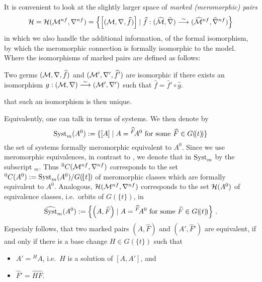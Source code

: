 It is convenient to look at the slightly larger space of \emph{marked
(meromorphic) pairs}
\[
  \mathcal{H}=\mathcal{H}(\mathcal{M}^{nf},\nabla^{nf})=\left\{
    \left[(\mathcal{M},\nabla,\widehat f)\right]
      \mid
      \widehat f:(\widehat{\mathcal{M}},\widehat\nabla)
        \overset{\sim}\longrightarrow
        (\widehat{\mathcal{M}}^{nf},\widehat\nabla^{nf})
  \right\}
\]
in which we also handle the additional information, of the formal isomorphism,
by which the meromorphic connection is formally isomorphic to the model.
Where the isomorphisms of marked pairs are defined as follows:
\begin{defn}
  Two germs $(\mathcal{M},\nabla,\widehat f)$ and $(\mathcal{M}',\nabla',\widehat f')$ are
  isomorphic if there exists an isomorphism
  $g:(\mathcal{M},\nabla)\overset{\sim}\longrightarrow(\mathcal{M}',\nabla')$ such that
  $\hat f=\hat f'\circ \hat g$.
  \begin{s-rem}
     \cite[111]{sabbah2007isomonodromic} that such
    an isomorphism is then unique.
  \end{s-rem}
\end{defn}

Equivalently, one can talk in terms of systems. We then denote by
\[
  \operatorname{Syst}_m(A^0):=\{[A]
    \mid A={}^{\widehat F}\!A^0 \text{ for some } \widehat F\in G(\!(t)\!)\}
\]
the set of systems formally meromorphic equivalent to $A^0$.
Since we use meromorphic equivalences, in contrast to \cite{boalch,thboalch},
we denote that in $\operatorname{Syst}_m$ by the subscript ${}_m$.
Thus ${}^0C(\mathcal{M}^{nf},\nabla^{nf})$ corresponds to
the set ${}^0C(A^0):=\operatorname{Syst}_m(A^0)/G(\!\{t\}\!)$ of meromorphic classes which
are formally equivalent to $A^0$.
Analogous, $\mathcal{H}(\mathcal{M}^{nf},\nabla^{nf})$ corresponds to the set $\mathcal{H}(A^0)$ of
equivalence classes, i.e.\ orbits of $G(\!\{t\}\!)$, in
\[
  \widehat{\operatorname{Syst}}_m(A^0):=\left\{\left(A,\widehat F\right)
    \mid A={}^{\widehat F}\!A^0 \text{ for some } \widehat F\in G(\!(t)\!)\right\} \,.
\]
Especialy follows, that two marked pairs $(A,\hat F)$ and $(A',\hat F')$ are
equivalent, if and only if there is a base change
$H\in G(\!\{t\}\!)$ such that
\begin{itemize}
  \item $A'={}^{H}\!A$, i.e.\ $H$ is a solution of $[A,A']$, and
  \item $\hat F'=\hat H\hat F$.
    \begin{comment}
      \[
        {}^{\hat H\hat F}A^0
        =
        {}^{\hat H}({}^{\hat F}A^0)
        =
        {}^{\hat H}A
        =
        A'
        =
        {}^{\hat F'}A^0
      \]
    \end{comment}
\end{itemize}


